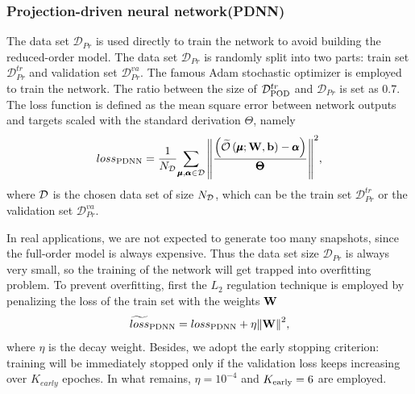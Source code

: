 \documentclass[preprint, 10pt]{elsarticle}
\begin{document}
\subsubsection{Projection-driven neural network(PDNN)}
The data set $\mathcal{D}_{Pr}$ is used directly to train the network to avoid building the reduced-order model. The data set $\mathcal{D}_{Pr}$ is randomly split into two parts: train set $\mathcal{D}_{Pr}^{tr}$ and validation set $\mathcal{D}_{Pr}^{va}$. The famous Adam  stochastic  optimizer \cite{kingma2014adam} is employed to train the network. The ratio between the size of $\mathcal{D}_{\rm{POD}}^{tr}$ and $\mathcal{D}_{Pr}$  is set as 0.7. The loss function is defined as the mean square error between network outputs and targets scaled with the standard derivation $\Theta$, namely
\begin{equation}
loss_{\rm{PDNN}} = \frac{1}{N_{\cal D}}
{{\sum\limits_{\pmb\mu ,\pmb\alpha  \in {\cal D}} {{{\left\| {\frac{\left( {\widetilde {\cal O}\left( {\pmb\mu ;{\bf{W}},{\bf{b}}} \right) - \pmb{\alpha} } \right)} {\pmb{\Theta}} } \right\|}^2}} }},
\end{equation}
where $\cal D$ is the chosen data set of size $N_{\cal D}$, which can be the train set $\mathcal{D}_{Pr}^{tr}$ or the validation set $\mathcal{D}_{Pr}^{va}$.

In real applications, we are not expected to generate too many snapshots, since the full-order model is always expensive. Thus the data set size $\mathcal{D}_{Pr}$ is always very small, so the training of the network will get trapped into overfitting problem. To prevent overfitting, first the $L_2$ regulation technique is employed by penalizing the loss of the train set with the weights $\bf{W}$
\begin{equation}
\widetilde{loss}_{\rm{PDNN}}
 = loss_{\rm{PDNN}}
  + \eta {\left\| { \mathbf{W} } \right\|}^2,
\end{equation}
where $\eta$ is the decay weight.
Besides, we adopt the early stopping criterion: training will be immediately stopped only if the validation loss keeps increasing over $K_{early}$ epoches. In what remains, $\eta=10^{-4}$ and $K_{\rm{early}}=6$ are employed.
\end{document}
